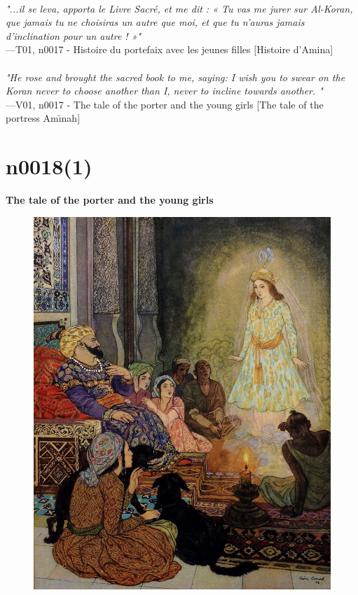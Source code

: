 \documentclass[../Carre_nights.tex]{subfiles}
\begin{document}
\textit{\\
"...il se leva, apporta le Livre Sacré, et me dit : « Tu vas me jurer sur Al-Koran, que jamais tu ne choisiras un autre que moi, et que tu n’auras jamais d’inclination pour un autre ! »"} \\
—T01, n0017 - Histoire du portefaix avec les jeunes filles [Histoire d'Amina] \\~\\
\textit{"He rose and brought the sacred book to me, saying:  I wish you to swear on the Koran never to choose another than I, never to incline towards another. "} \\
—V01, n0017 - The tale of the porter and the young girls [The tale of the portress Am\={\i}nah]

\newpage

\section{n0018(1)}
\textbf{\Large{The tale of the porter and the young girls}} \\

\begin{figure}[ht]
\centering
\includegraphics[height=\figsize]{illustrations/volume_1/T01, n0018(1) - Histoire du portefaix avec les jeunes filles.jpg}
\end{figure}
\end{document}
